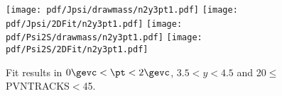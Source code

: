 \begin{figure}[H]
\begin{center}
\texttt{[image: pdf/Jpsi/drawmass/n2y3pt1.pdf]}
\texttt{[image: pdf/Jpsi/2DFit/n2y3pt1.pdf]}
\vspace*{-0.5cm}
\texttt{[image: pdf/Psi2S/drawmass/n2y3pt1.pdf]}
\texttt{[image: pdf/Psi2S/2DFit/n2y3pt1.pdf]}
\vspace*{-0.5cm}
\end{center}
\caption{Fit results in $0\gevc<\pt<2\gevc$, $3.5<y<4.5$ and 20$\leq$PVNTRACKS$<$45.}
\label{Fitn2y3pt1}
\end{figure}
